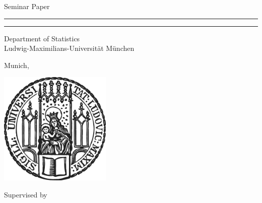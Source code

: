 
\begin{titlepage}
\begin{center}

\LARGE
Seminar Paper

\vspace{0.5cm}

\rule{\textwidth}{1.5pt}
\LARGE
\textbf{\mytitle}
\rule{\textwidth}{1.5pt}

\vspace{0.5cm}

\large
Department of Statistics \\
Ludwig-Maximilians-Universität München

\vfill

\Large
\textbf{\myname}

\vfill

\large
Munich, \dueday~\duemonth~\dueyear

\vfill

\includegraphics[width = 0.4\textwidth]{params/sigillum.png}

\vfill

\normalsize


Supervised by \mysupervisor

\end{center}
\end{titlepage}
